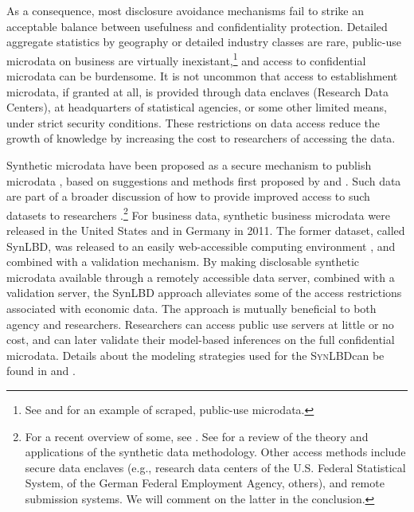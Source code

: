\documentclass[10pt,twoside]{article}
\newcommand{\SynLBD}{\textsc{SynLBD}}
\begin{document}
As a consequence, most disclosure avoidance mechanisms  fail to strike an acceptable balance between usefulness and confidentiality protection. Detailed aggregate statistics by geography or detailed industry classes  are rare, public-use microdata on business are virtually inexistant,\footnote{See \citet{NBERw22095} and \citet{startupcartography} for an example of scraped, public-use microdata.} and access to confidential microdata can be burdensome. It is not uncommon that access to establishment microdata, if granted at all, is provided through data enclaves (Research Data Centers), at headquarters of statistical agencies, or some other limited means, under strict security conditions. These restrictions on data access reduce the growth of knowledge by increasing the cost to researchers of accessing the data.

Synthetic microdata have been proposed as a secure mechanism to publish microdata \citep{drechsler2008,RePEc:taf:japsta:v:39:y:2012:i:2:p:243-265,NAP11844,SJIAOS-2014c}, based on suggestions and methods first proposed by \citet{rubin93} and \citet{little93}. Such data are  part of a broader discussion of how  to provide improved access to such datasets to researchers  \citep{Bender2009,Vilhuber2013,AbowdLane2004,AbowdSchmutte_BPEA2015}.\footnote{For a recent overview of some, see \citet{VilhuberAbowdReiter:Synthetic:SJIAOS:2016}. See \citet{dre:2011} for a review of the theory and applications of the synthetic data methodology.
	Other access methods include secure data enclaves (e.g., research data centers of the U.S. Federal Statistical System, of the  German Federal Employment Agency, others), and  remote submission systems. We will comment on the latter in the conclusion.}
For business data, synthetic business microdata were released in the United States \citep{KinneyEtAl2011} and in Germany  \citep{RePEc:iab:iabfme:201101_de} in 2011. The former dataset, called \ac{SynLBD}, was  released to an easily web-accessible computing environment \citep{AbowdVilhuber2010}, and combined with a validation mechanism.  By making disclosable synthetic microdata available through a remotely accessible data server, combined with a validation server, the SynLBD approach alleviates some of the access restrictions associated with economic data. The approach is mutually beneficial to both agency and researchers. Researchers can access public use servers at little or no cost, and can later validate their model-based inferences on the full confidential microdata. Details about the modeling strategies used for the \SynLBD  can be found in  \citet{KinneyEtAl2011} 
and \citet{RePEc:cen:tnotes:11-01}.
\end{document}
